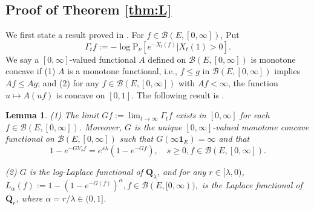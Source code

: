 \documentclass[12pt,a4paper]{amsart}
\numberwithin{equation}{section}
\theoremstyle{plain}
\newtheorem{lem}[thm]{Lemma}
\theoremstyle{definition}
\theoremstyle{remark}
\begin{document}
\begin{comment}
Note that
 \begin{equation}\label{domi-Zt1}
\frac{1}{\langle\phi, X_t\rangle + \int^0_{-t}w_{-s}(\phi)\mathbf N^\xi({\mathrm d}s, {\mathrm d}w)}\leq \frac{1}{\int^0_{-1}w_{-s}(\phi)\mathbf N^\xi({\mathrm d}s, {\mathrm d}w)},\quad t\geq 1,
 \end{equation}
and
\begin{equation}
\mathrm Q\left(\frac{1}{\int^0_{-1}w_{-s}(\phi)\mathbf N^\xi({\mathrm d}s, {\mathrm d}w)}\right)= \widetilde {\mathrm N}_{\phi\cdot\nu} [w_1(\phi)^{-1}]
= \mathrm N_{\phi\cdot\nu} (w_1\neq \mathbf 0) < \infty.
    \end{equation}
\end{comment}

\subsection{Proof of Theorem \ref{thm:L}}
We first state a result proved in \cite{LiuRenSongSun2020}. For $f\in \mathcal B(E, [0,\infty])$, Put
$$
\Gamma_t f:=-\log \mathrm P_{\nu}[e^{-X_t(f)}|X_t(1)>0].
$$
We say a $[0,\infty]$-valued functional $A$ defined on $\mathcal B(E,[0,\infty])$ is monotone concave if
	(1) $A$ is a monotone functional, i.e., $f\leq g$ in $\mathcal B(E,[0,\infty])$ implies $Af \leq Ag$; and
	(2) for any $f\in \mathcal B(E,[0,\infty])$ with $Af< \infty$, the function $u \mapsto A(uf)$ is concave on $[0,1]$.
The following result is \cite[Proposition 1.5, Proposition 1.9]{LiuRenSongSun2020}.

\begin{lem} \label{prop:G}
(1) The limit $Gf:= \lim_{t\to \infty} \Gamma_t f$ exists in $[0,\infty]$ for each $f\in \mathcal B(E,[0,\infty])$.
	Moreover, $G$ is the unique $[0,\infty]$-valued monotone concave functional on $\mathcal B(E,[0,\infty])$ such that
	$G(\infty  \mathbf 1_E) = \infty$ and that
\begin{equation} \label{eq:G.0}
	1 - e^{- GV_s f}
	= e^{s\lambda} (1 - e^{-Gf}),
	\quad s\geq 0, f\in \mathcal B(E,[0,\infty]).
\end{equation}

(2) $G$ is the log-Laplace functional of $\mathbf Q_\lambda$, and for any $r\in[\lambda, 0)$,
$L_\alpha(f):=1-\left(1-e^{-G(f)}\right)^\alpha, f\in\mathcal B(E,[0,\infty)),$
is the Laplace functional of $\mathbf Q_r$, where $\alpha=r/\lambda\in(0,1]$.
\end{lem}
\end{document}
